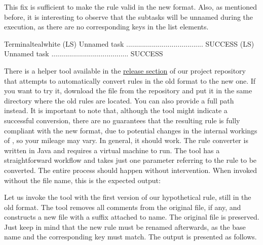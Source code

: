 This fix is sufficient to make the rule valid in the new format. Also, as mentioned before, it is interesting to observe that the subtasks will be unnamed during the execution, as there are no corresponding  keys in the list elements.

\begin{codebox}{Terminal}{teal}{\icnote}{white}
(LS) Unnamed task ....................................... SUCCESS
(LS) Unnamed task ....................................... SUCCESS
\end{codebox}

There is a helper tool available in the \href{https://github.com/cereda/arara/releases/tag/4.0}{release section} of our project repository that attempts to automatically convert rules in the old format to the new one. If you want to try it, download the  file from the repository and put it in the same directory where the old rules are located. You can also provide a full path instead. It is important to note that, although the tool might indicate a successful conversion, there are no guarantees that the resulting rule is fully compliant with the new format, due to potential changes in the internal workings of \arara, so your mileage may vary. In general, it should work. The rule converter is written in Java and requires a virtual machine to run. The tool has a straightforward workflow and takes just one parameter referring to the rule to be converted. The entire process should happen without intervention. When invoked without the file name, this is the expected output:


Let us invoke the tool with the first version of our hypothetical  rule, still in the old format. The tool removes all comments from the original file, if any, and constructs a new file with a  suffix attached to name. The original file is preserved. Just keep in mind that the new rule must be renamed afterwards, as the base name and the corresponding  key must match. The output is presented as follows.

